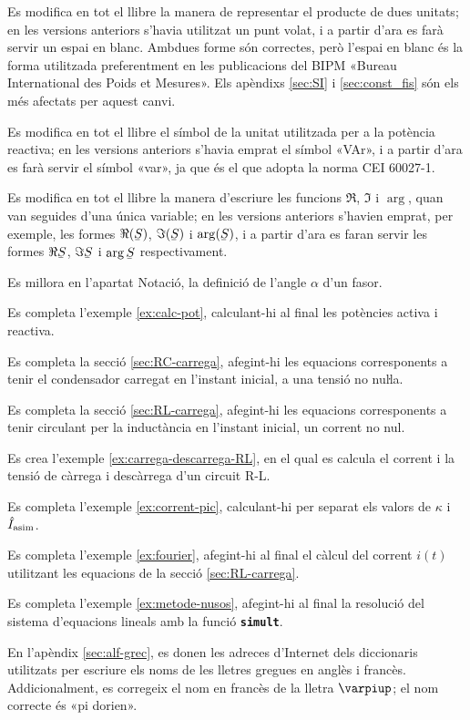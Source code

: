 Es modifica en tot el llibre la manera de representar el producte de dues unitats; en les versions anteriors s'havia utilitzat un punt volat, i a partir d'ara es farà servir un espai en blanc. Ambdues forme són correctes, però l'espai en blanc és la forma utilitzada preferentment en les publicacions del BIPM «Bureau International des Poids et Mesures». Els apèndixs \ref{sec:SI} i \ref{sec:const_fis} són els més afectats per aquest canvi.

Es modifica en tot el llibre el símbol de la unitat  utilitzada per a la potència reactiva; en les versions anteriors s'havia emprat el símbol «VAr», i a partir d'ara es farà servir el símbol «var», ja que és el que adopta la norma CEI 60027-1.

Es modifica en tot el llibre la manera d'escriure les funcions $\Re$, $\Im$ i $\arg$, quan van seguides d'una única variable; en les versions anteriors s'havien emprat, per exemple, les formes $\Re(\cmplx{S})$, $\Im(\cmplx{S})$ i $\arg(\cmplx{S})$, i a partir d'ara es faran servir les formes $\Re\cmplx{S}$, $\Im\cmplx{S}$ i $\arg\cmplx{S}$ respectivament.


Es millora en l’apartat Notació, la definició de l’angle $\alpha$ d’un fasor.


Es completa l'exemple \ref{ex:calc-pot}, calculant-hi al final les potències activa i reactiva.

Es completa la secció \ref{sec:RC-carrega}, afegint-hi les equacions corresponents a tenir el condensador carregat en l'instant inicial, a una tensió no nuŀla.

Es completa la secció \ref{sec:RL-carrega}, afegint-hi les equacions corresponents a tenir circulant per la inductància en l'instant  inicial, un corrent no nul.

Es crea l'exemple \ref{ex:carrega-descarrega-RL}, en el qual es calcula el corrent i la tensió de càrrega i descàrrega d'un circuit R-L.

Es completa l'exemple \ref{ex:corrent-pic}, calculant-hi per separat els valors de $\kappa$ i $\hat{I}_\mathrm{asim}$.


Es completa l'exemple \ref{ex:fourier}, afegint-hi al final el càlcul del corrent $i(t)$ utilitzant les equacions de la secció \ref{sec:RL-carrega}.

Es completa l'exemple \ref{ex:metode-nusos}, afegint-hi al final la resolució del sistema d'equacions lineals amb la funció \texttt{\textbf{simult}}.


En l'apèndix \ref{sec:alf-grec}, es donen les adreces d'Internet dels diccionaris utilitzats per escriure els noms de les lletres gregues en anglès i francès. Addicionalment, es corregeix el nom en francès de la lletra $\varpiup$; el nom correcte és «pi dorien».

